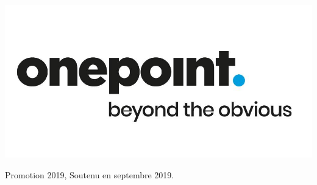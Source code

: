 \begin{titlepage}
\includegraphics[scale=0.15]{img/onepoint.jpg}\\[1cm]

\begin{flushright} \large 
	Promotion 2019, Soutenu en septembre 2019.
\end{flushright}

\vfill %

\end{titlepage}